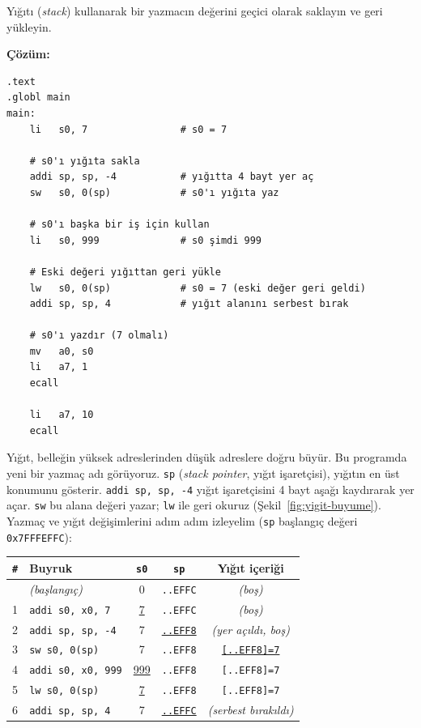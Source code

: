 \begin{ornek}[4.3]
\label{orn:yigit-temel}
Yığıtı (\emph{stack}) kullanarak bir yazmacın değerini geçici olarak saklayın ve geri yükleyin.

\textbf{Çözüm:}

\begin{lstlisting}[style=riscv]
.text
.globl main
main:
    li   s0, 7                # s0 = 7

    # s0'ı yığıta sakla
    addi sp, sp, -4           # yığıtta 4 bayt yer aç
    sw   s0, 0(sp)            # s0'ı yığıta yaz

    # s0'ı başka bir iş için kullan
    li   s0, 999              # s0 şimdi 999

    # Eski değeri yığıttan geri yükle
    lw   s0, 0(sp)            # s0 = 7 (eski değer geri geldi)
    addi sp, sp, 4            # yığıt alanını serbest bırak

    # s0'ı yazdır (7 olmalı)
    mv   a0, s0
    li   a7, 1
    ecall

    li   a7, 10
    ecall
\end{lstlisting}

Yığıt, belleğin yüksek adreslerinden düşük adreslere doğru büyür. Bu programda yeni bir yazmaç adı görüyoruz. \texttt{sp} (\emph{stack pointer}, yığıt işaretçisi), yığıtın en üst konumunu gösterir. \texttt{addi sp, sp, -4} yığıt işaretçisini 4 bayt aşağı kaydırarak yer açar. \texttt{sw} bu alana değeri yazar; \texttt{lw} ile geri okuruz (Şekil~\ref{fig:yigit-buyume}). Yazmaç ve yığıt değişimlerini adım adım izleyelim (\texttt{sp} başlangıç değeri \texttt{0x7FFFEFFC}):

\begin{center}
\small
\begin{tabular}{clccc}
\toprule
\texttt{\#} & Buyruk & \texttt{s0} & \texttt{sp} & Yığıt içeriği \\
\midrule
   & \emph{(başlangıç)} & 0 & \texttt{..EFFC} & \emph{(boş)} \\
1 & \texttt{addi s0, x0, 7} & \underline{7} & \texttt{..EFFC} & \emph{(boş)} \\
2 & \texttt{addi sp, sp, -4} & 7 & \underline{\texttt{..EFF8}} & \emph{(yer açıldı, boş)} \\
3 & \texttt{sw s0, 0(sp)} & 7 & \texttt{..EFF8} & \underline{\texttt{[..EFF8]=7}} \\
4 & \texttt{addi s0, x0, 999} & \underline{999} & \texttt{..EFF8} & \texttt{[..EFF8]=7} \\
5 & \texttt{lw s0, 0(sp)} & \underline{7} & \texttt{..EFF8} & \texttt{[..EFF8]=7} \\
6 & \texttt{addi sp, sp, 4} & 7 & \underline{\texttt{..EFFC}} & \emph{(serbest bırakıldı)} \\
\bottomrule
\end{tabular}
\end{center}


\end{ornek}
